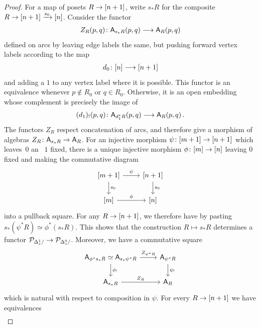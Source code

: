 \documentclass[10pt]{amsart}
\numberwithin{equation}{section}
\theoremstyle{definition}
\newcommand{\cP}{\mathcal{P}}
\newcommand{\sfA}{\mathsf{A}}
\renewcommand{\to}{\mathchoice{\longrightarrow}{\rightarrow}{}{}}
\begin{document}
\begin{proof}
	For a map of posets $R\to [n+1]$, write $s_{*}R$ for the composite $R \to [n+1] \xrightarrow{s_{0}} [n]$. Consider the functor
	\begin{align*}
		Z_{R}(p,q)\colon \sfA_{s_*R}(p,q) \to \sfA_{R}(p,q)
	\end{align*}
	defined on arcs by leaving edge labels the same, but pushing forward vertex labels according to the map
	\begin{align*}
		d_0 \colon [n] \to [n+1]
	\end{align*}
	and adding a $1$ to any vertex label where it is possible.
	This functor is an equivalence whenever $p\notin R_{0}$ or $q\in R_{0}$.
	Otherwise, it is an open embedding whose complement is precisely the image of
	\begin{align*}
		(d_{1})_{!}(p,q) \colon \sfA_{d_{1}^{*}R}(p,q) \to \sfA_{R}(p,q) \,.
	\end{align*}
	The functors $Z_{R}$ respect concatenation of arcs, and therefore give a morphism of algebras $Z_{R}\colon \sfA_{s_{*}R} \to \sfA_{R}$.
  For an injective morphism $\psi \colon [m+1] \to [n+1]$ which leaves~$0$ an~ $1$ fixed, there is a unique injective morphism $\phi\colon [m] \to [n]$ leaving $0$ fixed and making the commutative diagram
	\begin{equation*}
		\begin{tikzcd}
			{[m+1]} \arrow[r, "\psi"] \arrow[d, "s_{0}"]      &   {[n+1]}  \arrow[d, "s_{0}"] \\
			{[m]}  \arrow[r, "\phi"]               &   {[n]}
		\end{tikzcd}
	\end{equation*}
  into a pullback square.
	For any $R\to [n+1]$, we therefore have by pasting $s_{*}(\psi^{*}R) \simeq \phi^{*}(s_{*}R)$.
  This shows that the construction $R\mapsto s_{*}R$ determines a functor $\cP_{\Delta^{1}_{s}/} \to \cP_{\Delta^{0}_{s}/}$.
	Moreover, we have a commutative square
	\begin{equation*}
		\begin{tikzcd}
			\sfA_{\phi^{*}s_{*}R} \simeq \sfA_{s_{*}\psi^{*}R}\arrow[r, "Z_{\psi^{*}R}"] \arrow[d, "\phi_{!}"]      &   \sfA_{\psi^{*}R}  \arrow[d, "\psi_{!}"] \\
			\sfA_{s_{*}R}  \arrow[r, "Z_{R}"]               &   \sfA_{R}
		\end{tikzcd}
	\end{equation*}
	which is natural with respect to composition in $\psi$.
  For every $R\to [n+1]$ we have equivalences
	\begin{align*}

\end{align*}
\end{proof}
\end{document}

